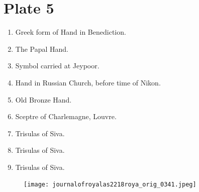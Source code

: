 \documentclass[a4paper, 11pt, oneside, english, landscape, twocolumn]{article}
\begin{document}
\section*{Plate 5}
\begin{enumerate}
    \item Greek form of Hand in Benediction.

    \item The Papal Hand.

    \item Symbol carried at Jeypoor.

    \item Hand in Russian Church, before time of Nikon.

    \item Old Bronze Hand.

    \item Sceptre of Charlemagne, Louvre.

    \item Trisulas of Siva.

    \item Trisulas of Siva.

    \item Trisulas of Siva.
\end{enumerate}
\vspace*{\fill}  
\clearpage
\clearpage
\vspace*{\fill}  
\begin{figure}[H]
\centering
\texttt{[image: journalofroyalas2218roya\_orig\_0341.jpeg]}
\end{figure}
\vspace*{\fill} 
\clearpage
\end{document}
